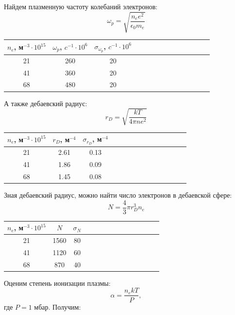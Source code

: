 \documentclass[14pt]{article}
\begin{document}
\newpage
Найдем плазменную частоту колебаний электронов:
$$
	\omega_p = \sqrt{\frac{n_ee^2}{\epsilon_0m_e}}
$$

\begin{center}
\begin{tabular}{|c|c|c|c|c|c|c|c|c|c|c|c|c|c|}
\hline
$n_e$, м$^{-3}\cdot10^{15}$	&	$\omega_p$, $c^{-1}\cdot 10^6$	&	$\sigma_{\omega_p}$, $c^{-1}\cdot 10^6$	\\
\hline
21							&	260								&	20											\\
\hline
41							&	360								&	20 											\\
\hline
68							&	480								&	20											\\
\hline
\end{tabular}
\end{center}

\vspace{1cm}
А также дебаевский радиус:
$$
	r_D = \sqrt{\frac{kT}{4\pi ne^2}}
$$

\begin{center}
\begin{tabular}{|c|c|c|c|c|c|c|c|c|c|c|c|c|c|}
\hline
$n_e$, м$^{-3}\cdot10^{15}$	&	$r_D$, м$^{-4}$		&	$\sigma_{r_D}$, м$^{-4}$	\\
\hline
21							&	2.61				&	0.13						\\
\hline
41							&	1.86				&	0.09						\\
\hline
68							&	1.45				&	0.08						\\
\hline
\end{tabular}
\end{center}

\vspace{1cm}
Зная дебаевский радиус, можно найти число электронов в дебаевской сфере:
$$
	N = \frac{4}{3}\pi r_D^3 n_e
$$

\begin{center}
\begin{tabular}{|c|c|c|c|c|c|c|c|c|c|c|c|c|c|}
\hline
$n_e$, м$^{-3}\cdot10^{15}$	&	$N$		&	$\sigma_N$	\\
\hline
21							&	1560	&	80			\\
\hline
41							&	1120	&	60			\\
\hline
68							&	870		&	40			\\
\hline
\end{tabular}
\end{center}

\vspace{1cm}
Оценим степень ионизации плазмы:
$$
	\alpha = \frac{n_ekT}{P},
$$
где $P = 1$ мбар. Получим:
\end{document}
